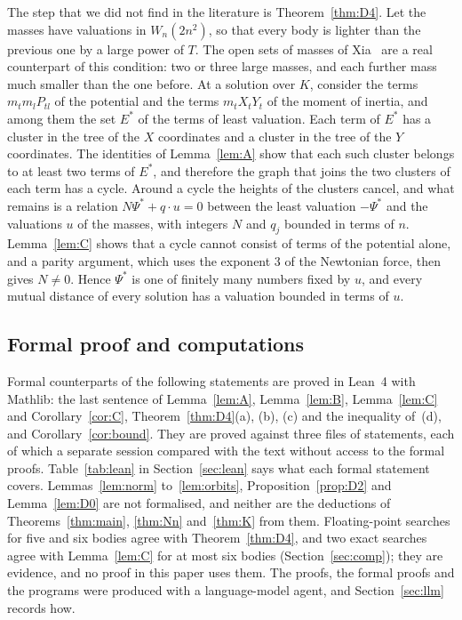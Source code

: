 \documentclass[11pt]{amsart}
\theoremstyle{definition}
\theoremstyle{remark}
\numberwithin{equation}{section}
\newcommand{\Ps}{\Psi^{*}}
\newcommand{\Es}{E^{*}}
\begin{document}
The step that we did not find in the literature is Theorem~\ref{thm:D4}. Let the masses have valuations
in $W_n(2n^2)$, so that every body is lighter than the previous one by a large power of $T$. The open
sets of masses of Xia~\cite{xia1991} are a real counterpart of this condition: two or three large
masses, and each further mass much smaller than the one before. At a solution
over $K$, consider the terms $m_t m_l P_{tl}$ of the potential and the terms $m_t X_t Y_t$ of the moment
of inertia, and among them the set $\Es$ of the terms of least valuation. Each term of $\Es$ has a cluster in the
tree of the $X$ coordinates and a cluster in the tree of the $Y$ coordinates. The identities of
Lemma~\ref{lem:A} show that each such cluster belongs to at least two terms of $\Es$, and therefore the
graph that joins the two clusters of each term has a cycle. Around a cycle the heights of the clusters
cancel, and what remains is a relation $N \Ps + q \cdot u = 0$ between the least valuation $-\Ps$ and the
valuations $u$ of the masses, with integers $N$ and $q_j$ bounded in terms of $n$. Lemma~\ref{lem:C}
shows that a cycle cannot consist of terms of the potential alone, and a parity argument, which uses the
exponent $3$ of the Newtonian force, then gives $N \ne 0$. Hence $\Ps$ is one of finitely many numbers
fixed by $u$, and every mutual distance of every solution has a valuation bounded in terms of $u$.

\subsection*{Formal proof and computations} Formal counterparts of the following statements are proved
in Lean~4 with Mathlib: the last sentence of Lemma~\ref{lem:A}, Lemma~\ref{lem:B}, Lemma~\ref{lem:C} and
Corollary~\ref{cor:C}, Theorem~\ref{thm:D4}(a), (b), (c) and the inequality of~(d), and
Corollary~\ref{cor:bound}. They are proved against three files of statements, each of which a separate
session compared with the text without access to the formal proofs. Table~\ref{tab:lean} in
Section~\ref{sec:lean} says what each formal statement covers. Lemmas~\ref{lem:norm}
to~\ref{lem:orbits}, Proposition~\ref{prop:D2} and Lemma~\ref{lem:D0} are not formalised, and neither are
the deductions of Theorems~\ref{thm:main}, \ref{thm:Nn} and~\ref{thm:K} from them. Floating-point searches
for five and six bodies agree with Theorem~\ref{thm:D4}, and two exact searches agree with
Lemma~\ref{lem:C} for at most six bodies (Section~\ref{sec:comp}); they are evidence, and no proof in this
paper uses them. The proofs, the formal proofs and the programs were produced with a language-model agent,
and Section~\ref{sec:llm} records how.
\end{document}
